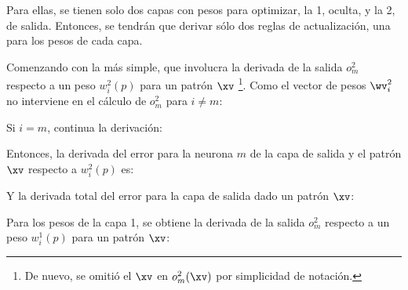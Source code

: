 Para ellas, se tienen solo dos capas con pesos para optimizar, la 1, oculta, y la 2, de salida. Entonces, se tendrán que derivar sólo dos reglas de actualización, una para los pesos de cada capa.

Comenzando con la más simple, que involucra la derivada de la salida $o_m^2$ respecto a un peso $w_i^2(p)$ para un patrón $\xv$ \footnote{De nuevo, se omitió el $\xv$ en $o_m^2(\xv)$ por simplicidad de notación.}. Como el vector de pesos $\wv_i^2$ no interviene en el cálculo de $o_m^2$ para $i \neq m$:


Si $i=m$, continua la derivación:



Entonces, la derivada del error para la neurona $m$ de la capa de salida y el patrón $\xv$ respecto a $w_i^2(p)$ es:


Y la derivada total del error para la capa de salida dado un patrón $\xv$:


Para los pesos de la capa 1, se obtiene la derivada de la salida $o_m^2$ respecto a un peso $w_i^1(p)$ para un patrón $\xv$:


